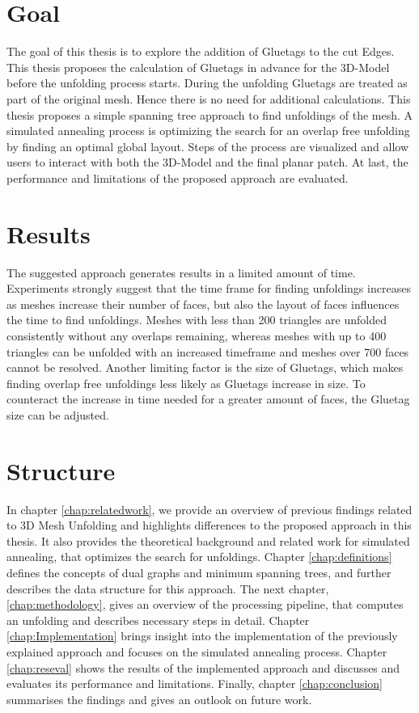 \documentclass[draft,final]{vutinfth} %
\begin{document}
\section{Goal}
The goal of this thesis is to explore the addition of Gluetags to the cut Edges. This thesis proposes the calculation of Gluetags in advance for the 3D-Model before the unfolding process starts. During the unfolding Gluetags are treated as part of the original mesh. Hence there is no need for additional calculations. This thesis proposes a simple spanning tree approach to find unfoldings of the mesh. A simulated annealing process is optimizing the search for an overlap free unfolding by finding an optimal global layout. Steps of the process are visualized and allow users to interact with both the 3D-Model and the final planar patch. At last, the performance and limitations of the proposed approach are evaluated.

\section{Results}
The suggested approach generates results in a limited amount of time. Experiments strongly suggest that the time frame for finding unfoldings increases as meshes increase their number of faces, but also the layout of faces influences the time to find unfoldings. Meshes with less than 200 triangles are unfolded consistently without any overlaps remaining, whereas meshes with up to 400 triangles can be unfolded with an increased timeframe and meshes over 700 faces cannot be resolved. Another limiting factor is the size of Gluetags, which makes finding overlap free unfoldings less likely as Gluetags increase in size. To counteract the increase in time needed for a greater amount of faces, the Gluetag size can be adjusted.

\section{Structure}
In chapter \ref{chap:relatedwork}, we provide an overview of previous findings related to 3D Mesh Unfolding and highlights differences to the proposed approach in this thesis. It also provides the theoretical background and related work for simulated annealing, that optimizes the search for unfoldings. Chapter \ref{chap:definitions} defines the concepts of dual graphs and minimum spanning trees, and further describes the data structure for this approach. The next chapter, \ref{chap:methodology}, gives an overview of the processing pipeline, that computes an unfolding and describes necessary steps in detail. Chapter \ref{chap:Implementation} brings insight into the implementation of the previously explained approach and focuses on the simulated annealing process. Chapter \ref{chap:reseval} shows the results of the implemented approach and discusses and evaluates its performance and limitations. Finally, chapter \ref{chap:conclusion} summarises the findings and gives an outlook on future work.
\end{document}
